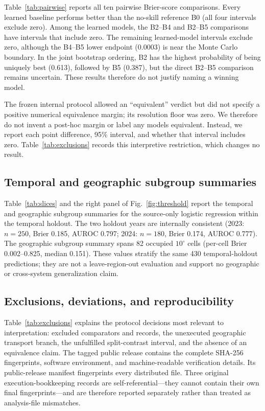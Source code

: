 \documentclass[pdflatex,sn-basic,iicol]{sn-jnl}
\begin{document}
Table~\ref{tab:pairwise} reports all ten pairwise Brier-score comparisons. Every
learned baseline performs better than the no-skill reference B0 (all four
intervals exclude zero). Among the learned models, the B2--B4 and B2--B5
comparisons have intervals that include zero. The remaining learned-model
intervals exclude zero, although the B4--B5 lower endpoint (0.0003) is
near the Monte Carlo boundary. In the joint
bootstrap ordering, B2 has the highest probability of being uniquely best
(0.613), followed by B5 (0.387), but the direct B2--B5 comparison remains
uncertain. These results therefore do not justify naming a winning model.

The frozen internal protocol allowed an ``equivalent'' verdict but did not specify a
positive numerical equivalence margin; its resolution floor was zero. We
therefore do not invent a post-hoc margin or label any models equivalent.
Instead, we report each point difference, 95\% interval, and
whether that interval includes zero. Table~\ref{tab:exclusions} records this
interpretive restriction, which changes no result.





\subsection{Temporal and geographic subgroup summaries}\label{sec:slices-results}

Table~\ref{tab:slices} and the right panel of Fig.~\ref{fig:threshold} report the
temporal and geographic subgroup summaries for the source-only logistic
regression within the temporal holdout. The two
holdout years are internally consistent (2023: $n=250$, Brier 0.185, AUROC 0.797;
2024: $n=180$, Brier 0.174, AUROC 0.777). The geographic subgroup summary spans
82 occupied $10^\circ$ cells (per-cell Brier 0.002--0.825, median 0.151).
These values stratify the same 430 temporal-holdout predictions; they are not a
leave-region-out evaluation and support no geographic or cross-system
generalization claim.



\subsection{Exclusions, deviations, and reproducibility}\label{sec:repro-results}

Table~\ref{tab:exclusions} explains the protocol decisions most relevant to
interpretation: excluded comparators and records, the unexecuted geographic
transport branch, the unfulfilled split-contrast interval, and the absence of an
equivalence claim. The tagged public release contains the complete SHA-256
fingerprints, software environment, and machine-readable verification details.
Its public-release manifest fingerprints every distributed file. Three original
execution-bookkeeping records are self-referential---they
cannot contain their own final fingerprints---and are therefore reported
separately rather than treated as analysis-file mismatches.
\end{document}
